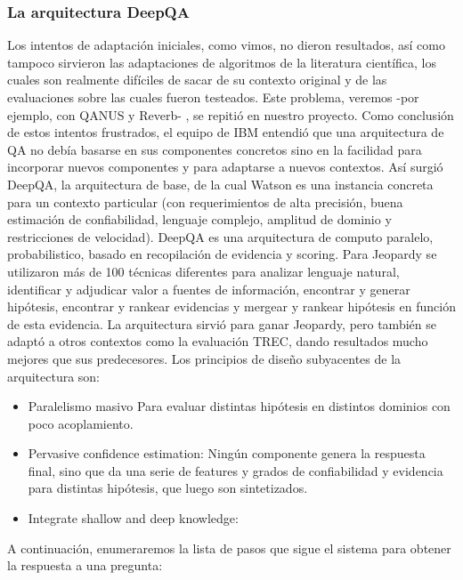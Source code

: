 \subsubsection*{La arquitectura DeepQA}
\label{subsec:deep-qa}
Los intentos de adaptación iniciales, como vimos, no dieron
resultados, así como tampoco sirvieron las adaptaciones de algoritmos
de la literatura científica, los cuales son realmente difíciles de
sacar de su contexto original y de las evaluaciones sobre las cuales
fueron testeados. Este problema, veremos -por ejemplo, con QANUS y
Reverb- , se repitió en nuestro proyecto. Como conclusión de estos
intentos frustrados, el equipo de IBM entendió que una arquitectura
de QA no debía basarse en sus componentes concretos sino en la
facilidad para incorporar nuevos componentes y para adaptarse a nuevos
contextos. Así surgió DeepQA, la arquitectura de base, de la cual
Watson es una instancia concreta para un contexto particular (con
requerimientos de alta precisión, buena estimación de
confiabilidad, lenguaje complejo, amplitud de dominio y restricciones
de velocidad). DeepQA es una arquitectura de computo paralelo,
probabilistico, basado en recopilación de evidencia y scoring. Para
Jeopardy se utilizaron más de 100 técnicas diferentes para analizar
lenguaje natural, identificar y adjudicar valor a fuentes de
información, encontrar y generar hipótesis, encontrar y rankear
evidencias y mergear y rankear hipótesis en función de esta
evidencia. La arquitectura sirvió para ganar Jeopardy, pero también
se adaptó a otros contextos como la evaluación TREC, dando
resultados mucho mejores que sus predecesores. Los principios de
diseño subyacentes de la arquitectura son:

\begin{itemize}
\item Paralelismo masivo\newline
Para evaluar distintas hipótesis en distintos dominios con poco
acoplamiento.
\item Pervasive confidence estimation:\newline
Ningún componente genera la respuesta final, sino que da una serie de
features y grados de confiabilidad y evidencia para distintas
hipótesis, que luego son sintetizados.
\item Integrate shallow and deep knowledge:
\end{itemize}

\bigskip

A continuación, enumeraremos la lista de pasos que sigue el sistema
para obtener la respuesta a una pregunta:

